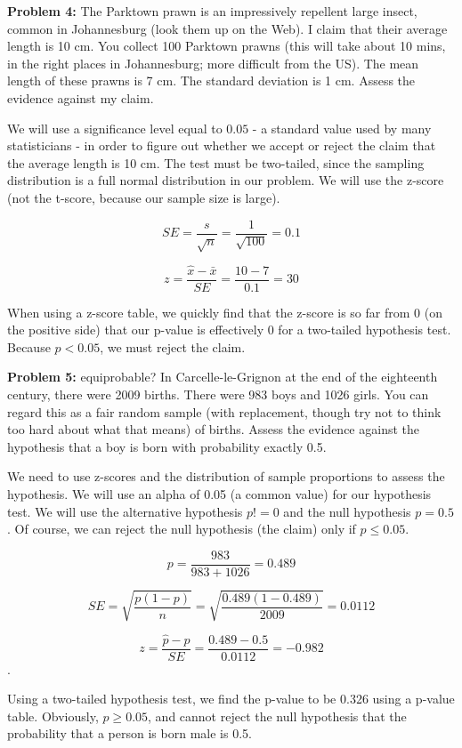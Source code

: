 \documentclass{article}
\begin{document}
 \begin{center}
      \Large\textbf{Problem 4:} The Parktown prawn is an impressively repellent large insect, common in Johannesburg (look them up on the Web). I claim that their average length is 10 cm. You collect 100 Parktown prawns (this will take about 10 mins, in the right places in Johannesburg; more difficult from the US). The mean length of these prawns is 7 cm. The standard deviation is 1 cm. Assess the evidence against my claim.\par
 \end{center}
 
 We will use a significance level equal to $0.05$ - a standard value used by many statisticians - in order to figure out whether we accept or reject the claim that the average length is 10 cm. The test must be two-tailed, since the sampling distribution is a full normal distribution in our problem. We will use the z-score (not the t-score, because our sample size is large).
 
 \[SE = \frac{s}{\sqrt{n}} = \frac{1}{\sqrt{100}} = 0.1\]

 \[z = \frac{\hat{x}-\bar{x}}{SE} = \frac{10-7}{0.1} = 30\]

 When using a z-score table, we quickly find that the z-score is so far from 0 (on the positive side) that our p-value is effectively 0 for a two-tailed hypothesis test. Because $p < 0.05$, we must reject the claim. 

 \newpage
 
 \noindent\makebox[\linewidth]{\rule{\paperwidth}{0.4pt}}\newline
 
 \begin{center}
     \Large\textbf{Problem 5:} equiprobable? In Carcelle-le-Grignon at the end of the eighteenth century, there were 2009 births. There were 983 boys and 1026 girls. You can regard this as a fair random sample (with replacement, though try not to think too hard about what that means) of births. Assess the evidence against the hypothesis that a boy is born with probability exactly 0.5.\par
 \end{center}
 
 We need to use z-scores and the distribution of sample proportions to assess the hypothesis. We will use an alpha of 0.05 (a common value) for our hypothesis test. We will use the alternative hypothesis $p != 0$ and the null hypothesis $p = 0.5$. Of course, we can reject the null hypothesis (the claim) only if $p \leq 0.05$.
 
 \[p = \frac{983}{983 + 1026} = 0.489\]
 
 \[SE = \sqrt{\frac{p(1-p)}{n}} = \sqrt{\frac{0.489(1-0.489)}{2009}} = 0.0112\]
 
 \[z = \frac{\hat{p} - p}{SE} = \frac{0.489 - 0.5}{0.0112} = -0.982\].
 
 Using a two-tailed hypothesis test, we find the p-value to be 0.326 using a p-value table. Obviously, $p \geq 0.05$, and cannot reject the null hypothesis that the probability that a person is born male is 0.5.

 
\end{document}
